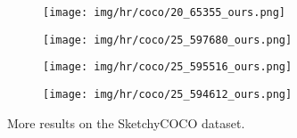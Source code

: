 \documentclass[10pt,twocolumn,letterpaper]{article}
\begin{document}
\begin{figure*}[tbp]
\begin{center}
  \begin{subfigure}[b]{\inwidth\linewidth}
  \texttt{[image: img/hr/coco/20\_65355\_ours.png]}
  \end{subfigure}
  \begin{subfigure}[b]{\inwidth\linewidth}
  \texttt{[image: img/hr/coco/25\_597680\_ours.png]}
  \end{subfigure}
\begin{subfigure}[b]{\inwidth\linewidth}
  \texttt{[image: img/hr/coco/25\_595516\_ours.png]}
  \end{subfigure}
  \begin{subfigure}[b]{\inwidth\linewidth}
  \texttt{[image: img/hr/coco/25\_594612\_ours.png]}
  \end{subfigure}
  
\end{center}
\caption{More  results on the SketchyCOCO dataset.}
 \label{fig:hr_coco}

\end{figure*}
\end{document}
